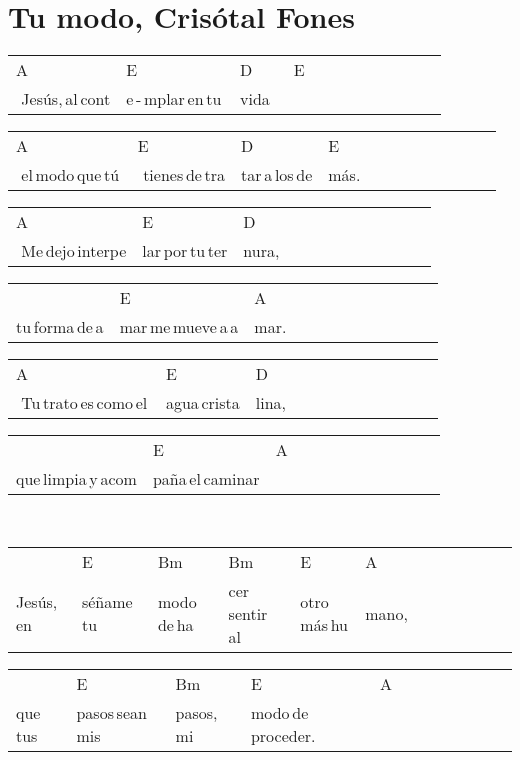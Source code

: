 \section*{Tu modo, Crisótal Fones\hfill}
\begin{multicols}{2}
\noindent
\begin{minipage}{\columnwidth}
\noindent
\noindent
\begin{tabular}{llllllllllll}
A&E&D&E\\
\,\,Jesús,\,al\,cont&e\,-\,mplar\,en\,tu\,&vida\,\,\,&
\end{tabular}

\noindent
\begin{tabular}{llllllllllll}
A&E&D&E\\
\,\,el\,modo\,que\,tú\,&\,\,tienes\,de\,tra&tar\,a\,los\,de&más.
\end{tabular}

\noindent
\begin{tabular}{llllllllllll}
A&E&D\\
\,\,Me\,dejo\,interpe&lar\,por\,tu\,ter&nura,
\end{tabular}

\noindent
\begin{tabular}{llllllllllll}
&E&A\\
tu\,forma\,de\,a&mar\,me\,mueve\,a\,a&mar.
\end{tabular}

\noindent
\begin{tabular}{llllllllllll}
A&E&D\\
\,\,Tu\,trato\,es\,como\,el\,&agua\,crista&lina,
\end{tabular}

\noindent
\begin{tabular}{llllllllllll}
&E&A\\
que\,limpia\,y\,acom&paña\,el\,caminar&
\end{tabular}
\end{minipage}\\

\noindent
\begin{minipage}{\columnwidth}
\noindent
\noindent
\begin{tabular}{llllllllllll}
&E&Bm&Bm&E&A\\
Jesús,\,en&séñame\,tu\,&modo\,de\,ha&cer\,sentir\,al\,&otro\,más\,hu&mano,
\end{tabular}

\noindent
\begin{tabular}{llllllllllll}
&E&Bm&E&A\\
que\,tus\,&pasos\,sean\,mis\,&pasos,\,mi\,&modo\,de\,proceder.\,\,&
\end{tabular}
\end{minipage}\\


\end{multicols}
